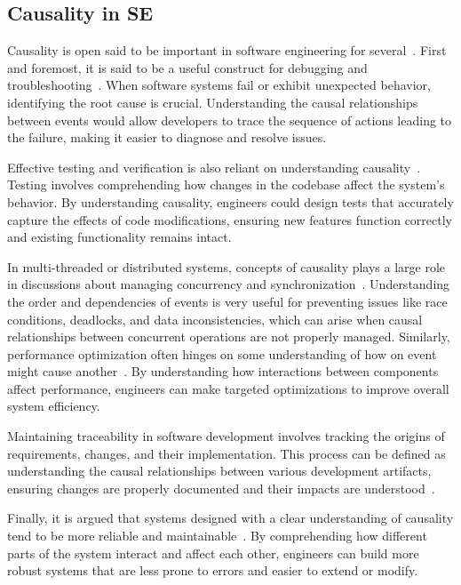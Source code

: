 \subsection{Causality in SE}

Causality is open said to be  important in software engineering for several~\cite{10197835, kazman2017causal}. 
First and foremost, it is  said to be a useful construct for debugging and troubleshooting~\cite{10.1145/3318464.3389694}. When software systems fail or exhibit unexpected behavior, identifying the root cause is crucial. 
Understanding the causal relationships between events would allow developers to trace the sequence of actions leading to the failure, making it easier to diagnose and resolve issues.

Effective testing and verification is also reliant on understanding causality~\cite{10.1145/3635709, 10.1145/3377811.3380377}. 
Testing involves comprehending how changes in the codebase affect the system's behavior. 
By understanding causality, engineers could design tests that accurately capture the effects of code modifications, ensuring new features function correctly and existing functionality remains intact.

In multi-threaded or distributed systems, 
concepts of causality plays a large role in 
discussions about managing concurrency and synchronization~\cite{485846, 6848128}. 
Understanding the order and dependencies of events is very useful for preventing issues like race conditions, deadlocks, and data inconsistencies, which can arise when causal relationships between concurrent operations are not properly managed. Similarly, performance optimization often hinges on 
some understanding of how on event might cause another~\cite{10.1007/978-3-030-59152-6_19, 10.1145/3492321.3519575, wu2019employing}. 
By understanding how interactions between components affect performance, engineers can make targeted optimizations to improve overall system efficiency.

Maintaining traceability in software development involves tracking the origins of requirements, changes, and their implementation. 
This process can be defined as  understanding the causal relationships between various development artifacts, ensuring changes are properly documented and their impacts are understood~\cite{6644251}.

Finally, it is argued that  systems designed with a clear understanding of causality tend to be more reliable and maintainable~\cite{7321183}. 
By comprehending how different parts of the system interact and affect each other, engineers can build more robust systems that are less prone to errors and easier to extend or modify. 

